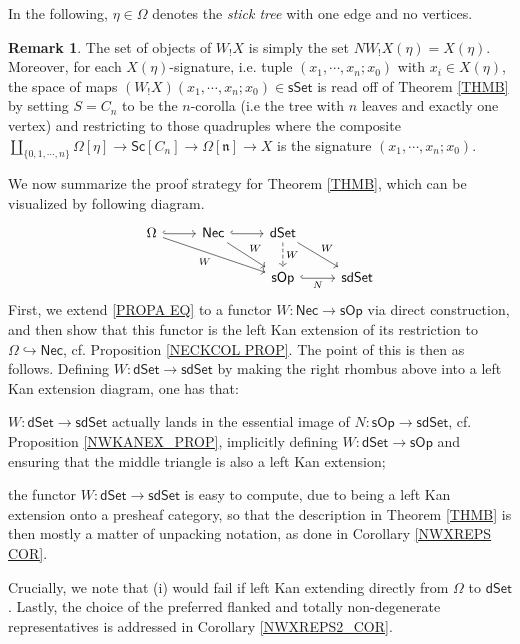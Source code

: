 \documentclass[a4paper,10pt
,draft
]{article}%
\numberwithin{equation}{section}
\numberwithin{figure}{section}
\theoremstyle{definition} %
\newtheorem{remark}[equation]{Remark}%
\newcommand{\sOp}{\ensuremath{\mathsf{sOp}}}%
\newcommand{\dSet}{\mathsf{dSet}}
\newcommand{\1}{\ensuremath{\mathbbm 1}}%
\begin{document}
In the following, $\eta \in \Omega$
denotes the \emph{stick tree} with one edge and no vertices.

\begin{remark}\label{READMAPSP REM}
	The set of objects of $W_! X$ is simply the set
	$NW_! X(\eta) = X(\eta)$.
	Moreover, for each $X(\eta)$-signature, 
	i.e. tuple $(x_1,\cdots,x_n;x_0)$ with $x_i \in X(\eta)$,
	the space of maps
	$(W_! X)(x_1,\cdots,x_n;x_0) \in \mathsf{sSet}$
	is read off of Theorem \ref{THMB}
	by setting $S=C_n$ to be the $n$-corolla
	(i.e the tree with $n$ leaves and exactly one vertex)
	and restricting to those quadruples where the composite
	$\coprod_{\{0,1,\cdots,n\}}\Omega[\eta] 
	\to \mathsf{Sc}[C_n] \to 
	\Omega[\mathfrak{n}] \to X$
	is the signature $(x_1,\cdots,x_n;x_0)$.
\end{remark}




We now summarize the proof strategy for Theorem \ref{THMB},
which can be visualized by following diagram.
\begin{equation}\label{KEYSTRAT EQ}
\begin{tikzcd}
\Omega \ar[hookrightarrow]{r}
\ar{rrd}[swap]{W} 
&
\mathsf{Nec}
\ar[hookrightarrow]{r}
\ar{rd}{W}
&
\mathsf{dSet} \ar{rd}{W}
\ar[dashed]{d}{W}
\\
&&
\mathsf{sOp} \ar[hookrightarrow]{r}[swap]{N} &
\mathsf{sdSet}
\end{tikzcd}
\end{equation}
First, 
we extend \eqref{PROPA EQ} to a functor
$W \colon \mathsf{Nec} \to \sOp$
via direct construction,
and then show that this functor is the left Kan extension of 
its restriction to 
$\Omega \hookrightarrow \mathsf{Nec}$,
cf. Proposition \ref{NECKCOL PROP}.
The point of this is then as follows.
Defining $W \colon \mathsf{dSet} \to \mathsf{sdSet}$
by making the right rhombus above into a left Kan extension diagram,
one has that:
\begin{enumerate*}
\item
$W \colon \mathsf{dSet} \to \mathsf{sdSet}$
actually lands in the essential image
of $N \colon \sOp \to \mathsf{sdSet}$,
cf. Proposition \ref{NWKANEX_PROP},
implicitly defining 
$W \colon \mathsf{dSet} \to \sOp$
and ensuring that the middle triangle is also a left Kan extension;
\item
the functor 
$W \colon \mathsf{dSet} \to \mathsf{sdSet}$
is easy to compute, due to being a left Kan extension onto a presheaf category,
so that the description in Theorem \ref{THMB}
is then mostly a matter of unpacking notation,
as done in Corollary \ref{NWXREPS COR}.
\end{enumerate*}
Crucially, we note that (i) would fail
if left Kan extending directly from 
$\Omega$ to $\dSet$. 
Lastly, the choice of the preferred 
flanked and totally non-degenerate 
representatives is addressed in 
Corollary \ref{NWXREPS2_COR}.
\end{document}
